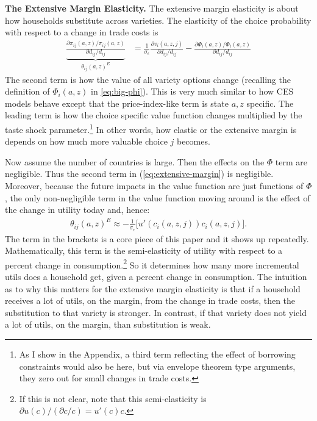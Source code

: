 \documentclass[12pt,pdftex]{article}
\begin{document}
\begin{onehalfspacing}
\textbf{The Extensive Margin Elasticity.} The extensive margin elasticity is about how households substitute across varieties. The elasticity of the choice probability with respect to a change in trade costs is
\begin{align}
\underbrace{ \frac{\partial \pi_{ij}(a,z) / \pi_{ij}(a,z)}{\partial d_{ij} / d_{ij}} }_{\theta_{ij}(a,z)^{E}} &=
\frac{1}{\sigma_{\epsilon}}\frac{\partial v_{i}(a,z,j)}{\partial d_{ij}/d_{ij}}  - \frac{\partial \Phi_{i}(a,z) / \Phi_{i}(a,z)}{\partial d_{ij}/d_{ij}}
\label{eq:extensive-margin}
\end{align}
The second term is how the value of all variety options change (recalling the definition of $\Phi_{i}(a,z)$  in \ref{eq:big-phi}). This is very much similar to how CES models behave except that the price-index-like term is state $a,z$ specific. The leading term is how the choice specific value function changes multiplied by the taste shock parameter.\footnote{As I show in the Appendix, a third term reflecting the effect of borrowing constraints would also be here, but via envelope theorem type arguments, they zero out for small changes in trade costs.} In other words, how elastic or the extensive margin is depends on how much more valuable choice $j$ becomes.

Now assume the number of countries is large. Then the effects on the $\Phi$ term are negligible. Thus the second term in (\ref{eq:extensive-margin}) is negligible. Moreover, because the future impacts in the value function are just functions of $\Phi$, the only non-negligible term in the value function moving around is the effect of the change in utility today and, hence:
\begin{align}
\theta_{ij}(a,z)^{E} \approx -\frac{1}{\sigma_{\epsilon}}\bigg[u'(c_{i}(a,z,j))c_{i}(a,z,j)\bigg]. \label{eq:extensive-margin-large}
\end{align}
The term in the brackets is a core piece of this paper and it shows up repeatedly. Mathematically, this term is the semi-elasticity of utility with respect to a percent change in consumption.\footnote{If this is not clear, note that this semi-elasticity is $ \partial u(c) / ( \partial c / c) = u'(c)c $.} So it determines how many more incremental utils does a household get, given a percent change in consumption. The intuition as to why this matters for the extensive margin elasticity is that if a household receives a lot of utils, on the margin, from the change in trade costs, then the substitution to that variety is stronger. In contrast, if that variety does not yield a lot of utils, on the margin, than substitution is weak.


\end{onehalfspacing}
\end{document}
